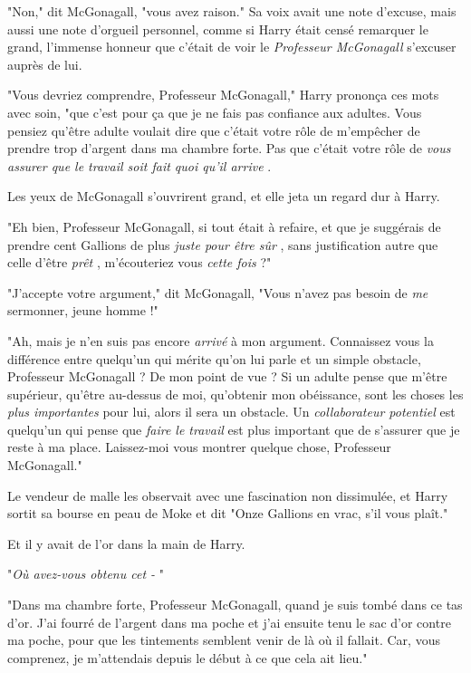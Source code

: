 "Non," dit McGonagall, "vous avez raison." Sa voix avait une note d'excuse, mais aussi une note d'orgueil personnel, comme si Harry était censé remarquer le grand, l'immense honneur que c'était de voir le \emph{Professeur McGonagall}  s'excuser auprès de lui.

"Vous devriez comprendre, Professeur McGonagall," Harry prononça ces mots avec soin, "que c'est pour ça que je ne fais pas confiance aux adultes. Vous pensiez qu'être adulte voulait dire que c'était votre rôle de m'empêcher de prendre trop d'argent dans ma chambre forte. Pas que c'était votre rôle de \emph{vous assurer que le travail soit fait quoi qu'il arrive} .

Les yeux de McGonagall s'ouvrirent grand, et elle jeta un regard dur à Harry.

"Eh bien, Professeur McGonagall, si tout était à refaire, et que je suggérais de prendre cent Gallions de plus \emph{juste pour être sûr} , sans justification autre que celle d'être \emph{prêt} , m'écouteriez vous \emph{cette fois}  ?"

"J'accepte votre argument," dit McGonagall, "Vous n'avez pas besoin de \emph{me } sermonner, jeune homme !"

"Ah, mais je n'en suis pas encore \emph{arrivé}  à mon argument. Connaissez vous la différence entre quelqu'un qui mérite qu'on lui parle et un simple obstacle, Professeur McGonagall ? De mon point de vue ? Si un adulte pense que m'être supérieur, qu'être au-dessus de moi, qu'obtenir mon obéissance, sont les choses les \emph{plus importantes}  pour lui, alors il sera un obstacle. Un \emph{collaborateur potentiel}  est quelqu'un qui pense que \emph{faire le travail}  est plus important que de s'assurer que je reste à ma place. Laissez-moi vous montrer quelque chose, Professeur McGonagall."

Le vendeur de malle les observait avec une fascination non dissimulée, et Harry sortit sa bourse en peau de Moke et dit "Onze Gallions en vrac, s'il vous plaît."

Et il y avait de l'or dans la main de Harry.

"\emph{Où avez-vous obtenu cet -} "

"Dans ma chambre forte, Professeur McGonagall, quand je suis tombé dans ce tas d'or. J'ai fourré de l'argent dans ma poche et j'ai ensuite tenu le sac d'or contre ma poche, pour que les tintements semblent venir de là où il fallait. Car, vous comprenez, je m'attendais depuis le début à ce que cela ait lieu."

